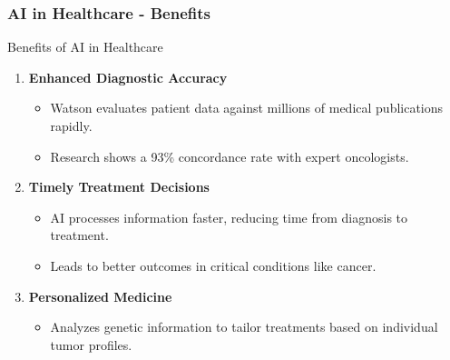 \documentclass[aspectratio=169]{beamer}
\begin{document}
\begin{frame}[fragile]
    \frametitle{AI in Healthcare - Benefits}
    \begin{block}{Benefits of AI in Healthcare}
        \begin{enumerate}
            \item \textbf{Enhanced Diagnostic Accuracy}
                \begin{itemize}
                    \item Watson evaluates patient data against millions of medical publications rapidly.
                    \item Research shows a 93\% concordance rate with expert oncologists.
                \end{itemize}
            \item \textbf{Timely Treatment Decisions}
                \begin{itemize}
                    \item AI processes information faster, reducing time from diagnosis to treatment.
                    \item Leads to better outcomes in critical conditions like cancer.
                \end{itemize}
            \item \textbf{Personalized Medicine}
                \begin{itemize}
                    \item Analyzes genetic information to tailor treatments based on individual tumor profiles.
                \end{itemize}
        \end{enumerate}
    \end{block}
\end{frame}
\end{document}
